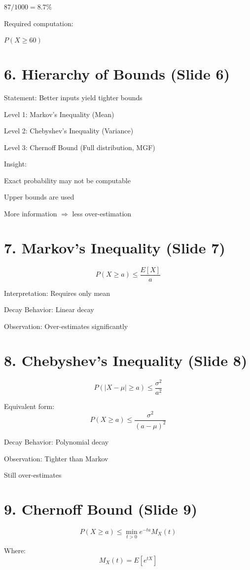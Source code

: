 \documentclass[12pt]{article}
\begin{document}
$87/1000 = 8.7\%$

Required computation:

$P(X \ge 60)$

\section*{6. Hierarchy of Bounds (Slide 6)}

Statement: Better inputs yield tighter bounds

Level 1: Markov’s Inequality (Mean)

Level 2: Chebyshev’s Inequality (Variance)

Level 3: Chernoff Bound (Full distribution, MGF)

Insight:

Exact probability may not be computable

Upper bounds are used

More information $\Rightarrow$ less over-estimation

\section*{7. Markov’s Inequality (Slide 7)}

\[
P(X \ge a) \le \frac{E[X]}{a}
\]

Interpretation: Requires only mean

Decay Behavior: Linear decay

Observation: Over-estimates significantly

\section*{8. Chebyshev’s Inequality (Slide 8)}

\[
P(|X - \mu| \ge a) \le \frac{\sigma^2}{a^2}
\]

Equivalent form:
\[
P(X \ge a) \le \frac{\sigma^2}{(a - \mu)^2}
\]

Decay Behavior: Polynomial decay

Observation: Tighter than Markov

Still over-estimates

\section*{9. Chernoff Bound (Slide 9)}

\[
P(X \ge a) \le \min_{t>0} e^{-ta} M_X(t)
\]

Where:
\[
M_X(t) = E[e^{tX}]
\]
\end{document}
